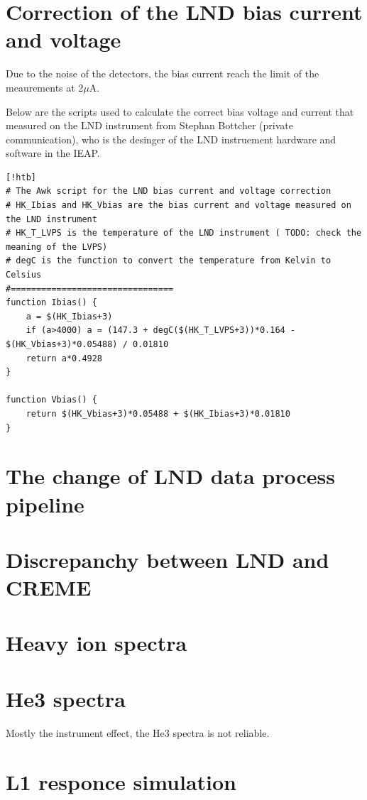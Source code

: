 \section{Correction of the LND bias current and voltage}

Due to the noise of the detectors, the bias current reach the limit of the meaurements at 2$\mu$A. 

Below are the scripts used to calculate the correct bias voltage and current that measured on the LND instrument from Stephan B\¨ottcher (private communication), who is the desinger of the LND instruement hardware and software in the IEAP.
\begin{lstlisting}[!htb]
# The Awk script for the LND bias current and voltage correction
# HK_Ibias and HK_Vbias are the bias current and voltage measured on the LND instrument
# HK_T_LVPS is the temperature of the LND instrument ( TODO: check the meaning of the LVPS)
# degC is the function to convert the temperature from Kelvin to Celsius
#================================
function Ibias() {
    a = $(HK_Ibias+3)
    if (a>4000) a = (147.3 + degC($(HK_T_LVPS+3))*0.164 - $(HK_Vbias+3)*0.05488) / 0.01810
    return a*0.4928
}

function Vbias() {
    return $(HK_Vbias+3)*0.05488 + $(HK_Ibias+3)*0.01810
}

\end{lstlisting}



\section{The change of LND data process pipeline}
\label{chp:appendix_LND_data_process_pipeline}

\section{Discrepanchy between LND and CREME}

\section{Heavy ion spectra}

\section{He3 spectra}
\label{chp:appendix_LND_He3_spectra}
Mostly the instrument effect, the He3 spectra is not reliable.

\section{L1 responce simulation}


